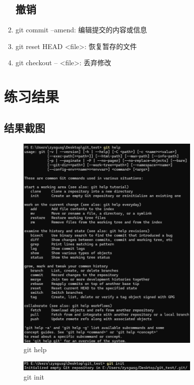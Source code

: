 \documentclass[UTF8]{ctexart}
\begin{document}
\begin{enumerate}
    \subsection{撤销}  
        \item git commit --amend: 编辑提交的内容或信息
        \item git reset HEAD <file>: 恢复暂存的文件
        \item git checkout -- <file>: 丢弃修改
        
\end{enumerate}


\section{练习结果}
\subsection{结果截图}
\begin{figure}[htbp] %
    \centering
    \includegraphics[width=0.8\textwidth]{1.png} 
    \caption{git help}
\end{figure}
\begin{figure}[htbp]
    \centering
    \includegraphics[width=0.8\textwidth]{2.png} 
    \caption{git init}
\end{figure}
\end{document}
